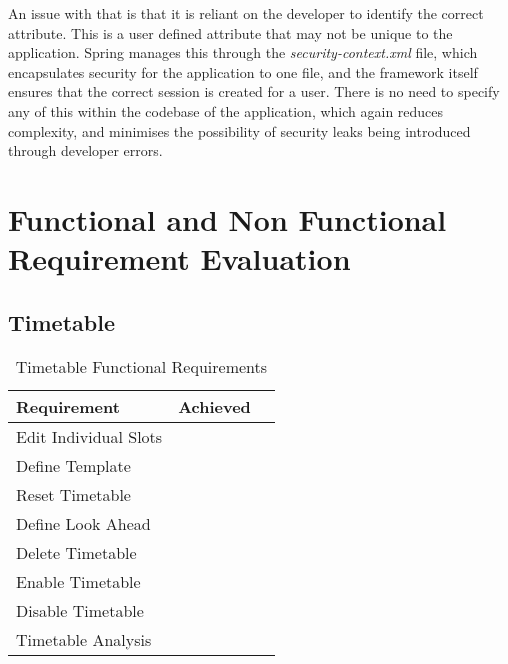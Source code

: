 An issue with that is that it is reliant on the developer to identify the correct attribute. This is a user defined attribute that may not be unique to the application. Spring manages this through the \textit{security-context.xml} file, which encapsulates security for the application to one file, and the framework itself ensures that the correct session is created for a user. There is no need to specify any of this within the codebase of the application, which again reduces complexity, and minimises the possibility of security leaks being introduced through developer errors.



\section{Functional and Non Functional Requirement Evaluation}

\subsection{Timetable}
\begin{table}[H]
\begin{center}
    \begin{tabular}{| l | l | p{1cm} |}
    \hline
    Requirement & Achieved\\ \hline
	Edit Individual Slots & \checkmark \\ \hline
	Define Template & \checkmark \\ \hline
	Reset Timetable & \checkmark \\ \hline
	Define Look Ahead & \checkmark \\ \hline
	Delete Timetable & \checkmark \\ \hline
	Enable Timetable & \checkmark \\ \hline
	Disable Timetable & \checkmark \\ \hline
	Timetable Analysis & \checkmark \\ \hline
	\end{tabular}
\end{center}
\caption{Timetable Functional Requirements}
\end{table}



